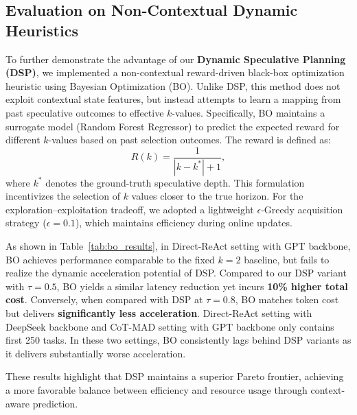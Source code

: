 \subsection{Evaluation on Non-Contextual Dynamic Heuristics}
To further demonstrate the advantage of our \textbf{Dynamic Speculative Planning (DSP)}, we implemented a non-contextual reward-driven black-box optimization heuristic using Bayesian Optimization (BO). 
Unlike DSP, this method does not exploit contextual state features, but instead attempts to learn a mapping from past speculative outcomes to effective $k$-values. 
Specifically, BO maintains a surrogate model (Random Forest Regressor) to predict the expected reward for different $k$-values based on past selection outcomes. 
The reward is defined as:
\[
R(k) = \frac{1}{|k - k^{\ast}| + 1},
\]
where $k^{\ast}$ denotes the ground-truth speculative depth. 
This formulation incentivizes the selection of $k$ values closer to the true horizon. 
For the exploration–exploitation tradeoff, we adopted a lightweight $\epsilon$-Greedy acquisition strategy ($\epsilon=0.1$), 
which maintains efficiency during online updates. 

As shown in Table~\ref{tab:bo_results}, in Direct-ReAct setting with GPT backbone, BO achieves performance comparable to the fixed $k=2$ baseline, but fails to realize the dynamic acceleration potential of DSP. Compared to our DSP variant with $\tau=0.5$, BO yields a similar latency reduction yet incurs \textbf{10\% higher total cost}. Conversely, when compared with DSP at $\tau=0.8$, BO matches token cost but delivers \textbf{significantly less acceleration}. 
Direct-ReAct setting with DeepSeek backbone and CoT-MAD setting with GPT backbone only contains first 250 tasks. In these two settings, BO consistently lags behind DSP variants as it delivers substantially worse acceleration.

These results highlight that DSP maintains a superior Pareto frontier, achieving a more favorable balance between efficiency and resource usage through context-aware prediction. 

